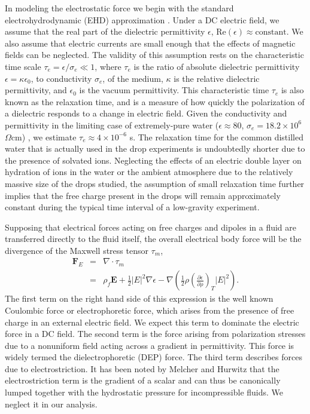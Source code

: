 \documentclass[aip,reprint, floatfix]{revtex4-1}
\begin{document}
In modeling the electrostatic force we begin with the standard electrohydrodynamic (EHD) approximation \cite{saville_electrohydrodynamics:_1997}. Under a DC electric field, we assume that the real part of the dielectric permittivity $\epsilon$, $\mbox{Re} \left( \epsilon \right) \approx  \mbox{constant}$. We also assume that electric currents are small enough that the effects of magnetic fields can be neglected. The validity of this assumption rests on the characteristic time scale $\tau_e = \epsilon /\sigma_e \ll 1$, where $\tau_e$ is the ratio of absolute dielectric permittivity $\epsilon = \kappa \epsilon_0$, to conductivity $\sigma_e$, of the medium, $\kappa$ is the relative dielectric permittivity, and $\epsilon_0$ is the vacuum permittivity. This characteristic time $\tau_e$ is also known as the relaxation time, and is a measure of how quickly the polarization of a dielectric responds to a change in electric field. Given the conductivity and permittivity in the limiting case of extremely-pure water ($ \epsilon \approx 80$, $\sigma_e = 18.2 \times 10^{6}$ $\Omega\mbox{cm}$) \cite{yatsuzuka_electrification_1994}, we estimate $\tau_e \approx 4 \times 10^{-6}$ s. The relaxation time for the common distilled water that is actually used in the drop experiments is undoubtedly shorter due to the presence of solvated ions. Neglecting the effects of an electric double layer on hydration of ions in the water or the ambient atmosphere due to the relatively massive size of the drops studied, the assumption of small relaxation time further implies that the free charge present in the drops will remain approximately constant during the typical time interval of a low-gravity experiment.

Supposing that electrical forces acting on free charges and dipoles in a fluid are transferred directly to the fluid itself, the overall electrical body force will be the divergence of the Maxwell stress tensor $\tau_m $,
\begin{eqnarray} \label{e_force}
 \mathbf{F}_E &=& \nabla \cdot \tau_m \nonumber \\ 
 &=& \rho_f \mathbf{E} + \frac{1}{2} \left| E \right|^2 \nabla \epsilon - \nabla \left( \frac{1}{2} \rho \left( \frac{\partial \epsilon}{\partial \rho} \right)_T \left| E \right|^2 \right) .
\end{eqnarray}
The first term on the right hand side of this expression is the well known Coulombic force or electrophoretic force, which arises from the presence of free charge in an external electric field. We expect this term to dominate the electric force in a DC field. The second term is the force arising from polarization stresses due to a nonuniform field acting across a gradient in permittivity. This force is widely termed the dielectrophoretic (DEP) force. The third term describes forces due to electrostriction. It has been noted by Melcher and Hurwitz \cite{hurwitz_electrohydrodynamic_1966} that the electrostriction term is the gradient of a scalar and can thus be canonically lumped together with the hydrostatic pressure for incompressible fluids. We neglect it in our analysis. 
\end{document}
